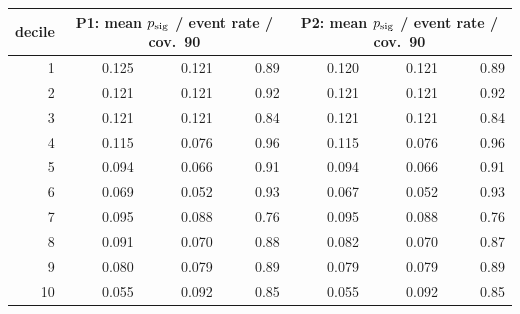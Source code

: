 \begin{tabular}{rrrrrrr}
\toprule
decile & \multicolumn{3}{c}{P1: mean $p_{\mathrm{sig}}$ / event rate / cov.\ 90} & \multicolumn{3}{c}{P2: mean $p_{\mathrm{sig}}$ / event rate / cov.\ 90} \\
\midrule
1 & 0.125 & 0.121 & 0.89 & 0.120 & 0.121 & 0.89 \\
2 & 0.121 & 0.121 & 0.92 & 0.121 & 0.121 & 0.92 \\
3 & 0.121 & 0.121 & 0.84 & 0.121 & 0.121 & 0.84 \\
4 & 0.115 & 0.076 & 0.96 & 0.115 & 0.076 & 0.96 \\
5 & 0.094 & 0.066 & 0.91 & 0.094 & 0.066 & 0.91 \\
6 & 0.069 & 0.052 & 0.93 & 0.067 & 0.052 & 0.93 \\
7 & 0.095 & 0.088 & 0.76 & 0.095 & 0.088 & 0.76 \\
8 & 0.091 & 0.070 & 0.88 & 0.082 & 0.070 & 0.87 \\
9 & 0.080 & 0.079 & 0.89 & 0.079 & 0.079 & 0.89 \\
10 & 0.055 & 0.092 & 0.85 & 0.055 & 0.092 & 0.85 \\
\bottomrule
\end{tabular}
